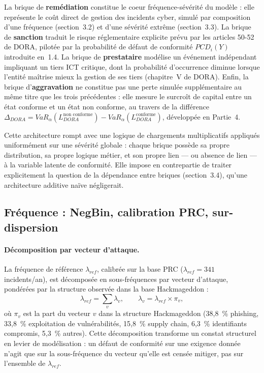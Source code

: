 \documentclass[11pt,a4paper]{article}
\theoremstyle{navystyle}
\theoremstyle{navydef}
\begin{document}
La brique de \textbf{remédiation} constitue le coeur fréquence-sévérité du
modèle : elle représente le coût direct de gestion des incidents cyber,
simulé par composition d'une fréquence (section~3.2) et d'une sévérité
extrême (section~3.3). La brique de \textbf{sanction} traduit le risque
réglementaire explicite prévu par les articles 50-52 de DORA, pilotée par la
probabilité de défaut de conformité $PCD_i(Y)$ introduite en~1.4. La
brique de \textbf{prestataire} modélise un événement indépendant impliquant
un tiers ICT critique, dont la probabilité d'occurrence diminue lorsque
l'entité maîtrise mieux la gestion de ses tiers (chapitre~V de DORA). Enfin,
la brique d'\textbf{aggravation} ne constitue pas une perte simulée
supplémentaire au même titre que les trois précédentes : elle mesure le
surcroît de capital entre un état conforme et un état non conforme, au
travers de la différence $\Delta_{DORA} = VaR_\alpha(L_{DORA}^{\text{non
conforme}}) - VaR_\alpha(L_{DORA}^{\text{conforme}})$, développée en
Partie~4.

Cette architecture rompt avec une logique de chargements multiplicatifs
appliqués uniformément sur une sévérité globale : chaque brique possède sa
propre distribution, sa propre logique métier, et son propre lien --- ou
absence de lien --- à la variable latente de conformité. Elle impose en
contrepartie de traiter explicitement la question de la dépendance entre
briques (section~3.4), qu'une architecture additive naïve négligerait.

\subsection{Fréquence : NegBin, calibration PRC, sur-dispersion}

\paragraph{Décomposition par vecteur d'attaque.} La fréquence de référence
$\lambda_{ref}$, calibrée sur la base PRC ($\lambda_{ref} = 341$
incidents/an), est décomposée en sous-fréquences par vecteur d'attaque,
pondérées par la structure observée dans la base Hackmageddon :
\begin{equation}
\lambda_{ref} = \sum_{v} \lambda_v,
\qquad
\lambda_v = \lambda_{ref} \times \pi_v,
\end{equation}
où $\pi_v$ est la part du vecteur $v$ dans la structure Hackmageddon
(38{,}8~\% phishing, 33{,}8~\% exploitation de vulnérabilités, 15{,}8~\%
supply chain, 6{,}3~\% identifiants compromis, 5{,}3~\% autres). Cette
décomposition transforme un constat structurel en levier de modélisation :
un défaut de conformité sur une exigence donnée n'agit que sur la
sous-fréquence du vecteur qu'elle est censée mitiger, pas sur l'ensemble de
$\lambda_{ref}$.
\end{document}

